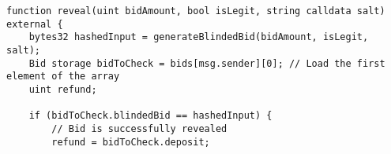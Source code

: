 \begin{lstlisting}[language=Solidity]
function reveal(uint bidAmount, bool isLegit, string calldata salt) external {
    bytes32 hashedInput = generateBlindedBid(bidAmount, isLegit, salt);
    Bid storage bidToCheck = bids[msg.sender][0]; // Load the first element of the array
    uint refund;

    if (bidToCheck.blindedBid == hashedInput) {
        // Bid is successfully revealed
        refund = bidToCheck.deposit;
\end{lstlisting}